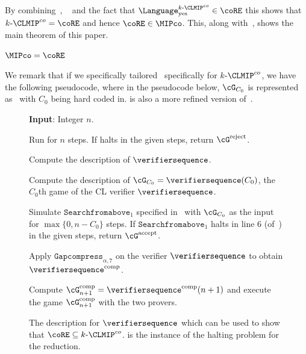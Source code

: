 By combining~, ~ and the fact that $\Language^{k\text{-}\CLMIP^{co}}_{\text{yes}} \in \coRE$  this shows that $k\text{-}\CLMIP^{co} = \coRE$ and hence $\coRE \in \MIPco$. This, along with~, shows the main theorem of this paper. 
\begin{corollary} \label{cor:MIPcocoRE}
	$\MIPco=\coRE$
\end{corollary}

We remark that if we specifically tailored~ specifically for $ k\text{-}\CLMIP^{co}$, we have the following pseudocode, where in the pseudocode below, $\cG_{C_0}$ is represented as~ with $C_0$ being hard coded in.  is also a more refined version of~\cite[Pseudocode 4]{mousaviNonlocalGamesCompression2022}. 

\begin{figure}[!t]
	\vspace{10pt}
	\IncMargin{1em}
	\begin{algorithm}[H]
		\DontPrintSemicolon
		
		\textbf{Input}: Integer $n$. 
		
		Run \Turingmachinehalt for $n$ steps. If \Turingmachinehalt halts in the given steps, return $\cG^{\text{reject}}$.
		
		Compute the description of $\verifiersequence$.
		
		Compute the description of $\cG_{C_0} = \verifiersequence(C_0)$, the $C_0$th game of the CL verifier $\verifiersequence$.
		
		Simulate $\texttt{Searchfromabove}_1$ specified in~ with $\cG_{C_0}$  as the input for $\max\{0, n - C_0\}$ steps. If $\texttt{Searchfromabove}_1$ halts in line 6 (of~) in the given steps, return $\cG^{\text{accept}}$. 
		
		Apply $\texttt{Gapcompress}_{\alpha, 7}$ on the verifier $\verifiersequence$ to obtain $\verifiersequence^{\text{comp}}$.
		
		Compute $\cG^{\text{comp}}_{n+1} = \verifiersequence^{\text{comp}}(n+1)$ and execute the game $\cG^{\text{comp}}_{n+1}$ with the two provers.
		
		\caption{The description for $\verifiersequence$ which can be used to show that $\coRE \subseteq k\text{-}\CLMIP^{co}$. \Turingmachinehalt is the instance of the halting problem for the reduction.}
		\label{pseu:verifiersequencemipco}
	\end{algorithm}\DecMargin{1em}
	\vspace{10pt} 
\end{figure}


